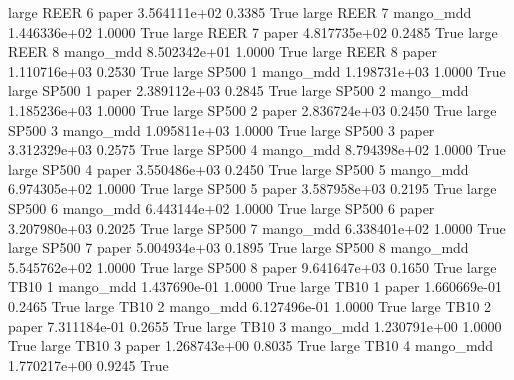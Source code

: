      large     REER                 6                 paper 3.564111e+02      0.3385    True
     large     REER                 7             mango_mdd 1.446336e+02      1.0000    True
     large     REER                 7                 paper 4.817735e+02      0.2485    True
     large     REER                 8             mango_mdd 8.502342e+01      1.0000    True
     large     REER                 8                 paper 1.110716e+03      0.2530    True
     large    SP500                 1             mango_mdd 1.198731e+03      1.0000    True
     large    SP500                 1                 paper 2.389112e+03      0.2845    True
     large    SP500                 2             mango_mdd 1.185236e+03      1.0000    True
     large    SP500                 2                 paper 2.836724e+03      0.2450    True
     large    SP500                 3             mango_mdd 1.095811e+03      1.0000    True
     large    SP500                 3                 paper 3.312329e+03      0.2575    True
     large    SP500                 4             mango_mdd 8.794398e+02      1.0000    True
     large    SP500                 4                 paper 3.550486e+03      0.2450    True
     large    SP500                 5             mango_mdd 6.974305e+02      1.0000    True
     large    SP500                 5                 paper 3.587958e+03      0.2195    True
     large    SP500                 6             mango_mdd 6.443144e+02      1.0000    True
     large    SP500                 6                 paper 3.207980e+03      0.2025    True
     large    SP500                 7             mango_mdd 6.338401e+02      1.0000    True
     large    SP500                 7                 paper 5.004934e+03      0.1895    True
     large    SP500                 8             mango_mdd 5.545762e+02      1.0000    True
     large    SP500                 8                 paper 9.641647e+03      0.1650    True
     large     TB10                 1             mango_mdd 1.437690e-01      1.0000    True
     large     TB10                 1                 paper 1.660669e-01      0.2465    True
     large     TB10                 2             mango_mdd 6.127496e-01      1.0000    True
     large     TB10                 2                 paper 7.311184e-01      0.2655    True
     large     TB10                 3             mango_mdd 1.230791e+00      1.0000    True
     large     TB10                 3                 paper 1.268743e+00      0.8035    True
     large     TB10                 4             mango_mdd 1.770217e+00      0.9245    True
